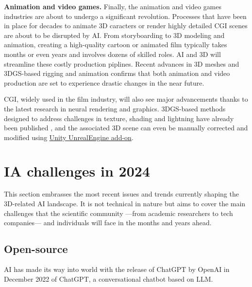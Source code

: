 \noindent \textbf{Animation and video games.} Finally, the animation and video games industries are about to undergo a significant revolution. Processes that have been in place for decades to animate 3D caracters or render highly detailed \ac{CGI} scenes are about to be disrupted by \ac{AI}. From storyboarding to 3D modeling and animation, creating a high-quality cartoon or animated film typically takes months or even years and involves dozens of skilled roles. \ac{AI} and 3D will streamline these costly production piplines. Recent advances in 3D meshes and 3D\ac{GS}-based rigging and animation \citep{qian2023gaussianavatars,li2024animatablegaussians} confirms that both animation and video production are set to  experience drastic changes in the near future. 

\ac{CGI}, widely used in the film industry, will also see major advancements thanks to the latest research in neural rendering and graphics. 3D\ac{GS}-based methods designed to address challenges in texture, shading and lightning have already been published \citep{jiang2023gaussianshader,wu2024deferredgs}, and the associated 3D scene can even be manually corrected and modified using \href{https://github.com/aras-p/UnityGaussianSplatting/}{Unity UnrealEngine add-on}. 


\section{IA challenges in 2024}

This section embrasses the most recent issues and trends currently shaping the 3D-related \ac{AI} landscape. It is not technical in nature but aims to cover the main challenges that the scientific community —from academic researchers to tech companies— and individuals will face in the months and years ahead.

\subsection{Open-source}
\label{sec:conclusion-open}
\ac{AI} has made its way into world with the release of ChatGPT by OpenAI in December 2022 of ChatGPT, a conversational chatbot based on \ac{LLM}. 

